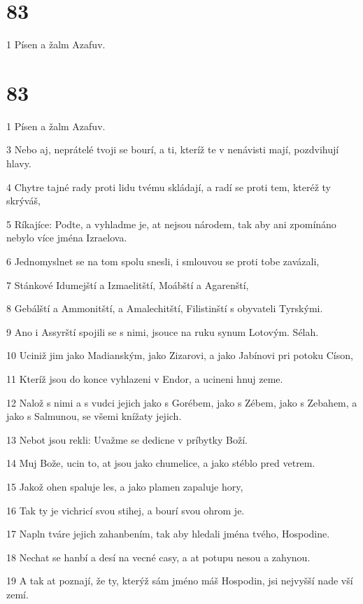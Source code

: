 \chapter{83}

\par 1 Písen a žalm Azafuv.

\chapter{83}

\par 1 Písen a žalm Azafuv.
\par 3 Nebo aj, neprátelé tvoji se bourí, a ti, kteríž te v nenávisti mají, pozdvihují hlavy.
\par 4 Chytre tajné rady proti lidu tvému skládají, a radí se proti tem, kteréž ty skrýváš,
\par 5 Ríkajíce: Podte, a vyhladme je, at nejsou národem, tak aby ani zpomínáno nebylo více jména Izraelova.
\par 6 Jednomyslnet se na tom spolu snesli, i smlouvou se proti tobe zavázali,
\par 7 Stánkové Idumejští a Izmaelitští, Moábští a Agarenští,
\par 8 Gebálští a Ammonitští, a Amalechitští, Filistinští s obyvateli Tyrskými.
\par 9 Ano i Assyrští spojili se s nimi, jsouce na ruku synum Lotovým. Sélah.
\par 10 Uciniž jim jako Madianským, jako Zizarovi, a jako Jabínovi pri potoku Císon,
\par 11 Kteríž jsou do konce vyhlazeni v Endor, a ucineni hnuj zeme.
\par 12 Nalož s nimi a s vudci jejich jako s Gorébem, jako s Zébem, jako s Zebahem, a jako s Salmunou, se všemi knížaty jejich.
\par 13 Nebot jsou rekli: Uvažme se dedicne v príbytky Boží.
\par 14 Muj Bože, ucin to, at jsou jako chumelice, a jako stéblo pred vetrem.
\par 15 Jakož ohen spaluje les, a jako plamen zapaluje hory,
\par 16 Tak ty je vichricí svou stihej, a bourí svou ohrom je.
\par 17 Napln tváre jejich zahanbením, tak aby hledali jména tvého, Hospodine.
\par 18 Nechat se hanbí a desí na vecné casy, a at potupu nesou a zahynou.
\par 19 A tak at poznají, že ty, kterýž sám jméno máš Hospodin, jsi nejvyšší nade vší zemí.

